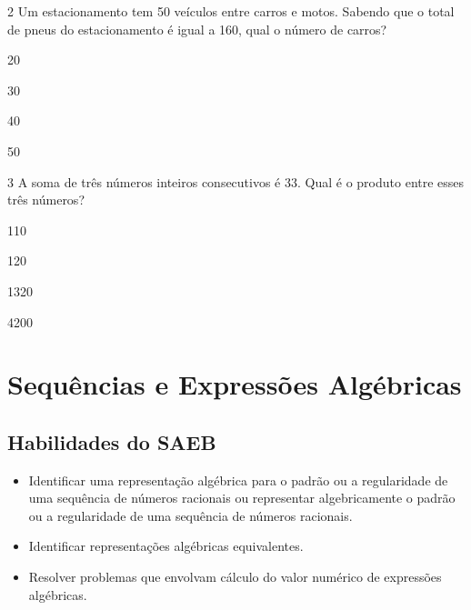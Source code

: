 \num{2} Um estacionamento tem 50 veículos entre carros e motos. Sabendo que o
total de pneus do estacionamento é igual a 160, qual o número de
carros?

\begin{escolha}

  \item 20

  \item 30

  \item 40

  \item 50

\end{escolha}

\num{3} A soma de três números inteiros consecutivos é 33. Qual é o produto
entre esses três números?

\begin{escolha}
  \item 110

  \item 120

  \item 1320

  \item 4200
\end{escolha}


\chapter{Sequências e Expressões Algébricas}

\section*{Habilidades do SAEB}

\begin{itemize}
  \item Identificar uma representação algébrica para o padrão ou a
regularidade de uma sequência de números racionais ou representar
algebricamente o padrão ou a regularidade de uma sequência de
números racionais. 
  \item Identificar representações algébricas equivalentes. 
  \item Resolver problemas que envolvam cálculo do valor numérico de
expressões algébricas. 
\end{itemize} 

